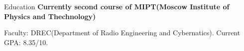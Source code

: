 \begin{rubric}{Education}
\entry*[2022 -- 2025]%
	\textbf{Currently second course of MIPT(Moscow Institute of Physics and Thechnology)
} 
	\par Faculty: DREC(Department of Radio Engineering and Cybernatics).
Current GPA: 8.35/10.

\end{rubric}